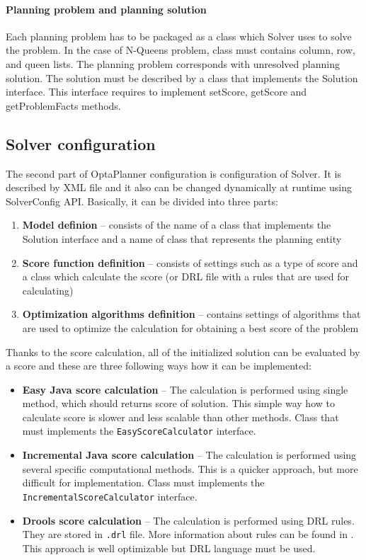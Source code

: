 \paragraph{Planning problem and planning solution}
Each planning problem has to be packaged as a class which Solver uses to solve the problem. In the case of N-Queens problem, class must contains column, row, and queen lists. The planning problem corresponds with unresolved planning solution. The solution must be described by a class that implements the Solution interface. This interface requires to implement setScore, getScore and getProblemFacts methods.

\subsection{Solver configuration}\label{ScoreConfigSection}
The second part of OptaPlanner configuration is configuration of Solver. It is described by XML file and it also can be changed dynamically at runtime using SolverConfig API. Basically, it can be divided into three parts:

\begin{enumerate}
\item \textbf{Model definion} -- consists of the name of a class that implements the Solution interface and a name of class that represents the planning entity
\item \textbf{Score function definition} -- consists of settings such as a type of score and a class which calculate the score (or DRL file with a rules that are used for calculating)
\item \textbf{Optimization algorithms definition} -- contains settings of algorithms that are used to optimize the calculation for obtaining a best score of the problem
\end{enumerate}

Thanks to the score calculation, all of the initialized solution can be evaluated by a score and these are three following ways how it can be implemented:

\begin{itemize}
\item \textbf{Easy Java score calculation} -- The calculation is performed using single method, which should returns score of solution. This simple way how to calculate score is slower and less scalable than other methods. Class that must implements the \texttt{EasyScoreCalculator} interface.
\item \textbf{Incremental Java score calculation} -- The calculation is performed using several specific computational methods. This is a quicker approach, but more difficult for implementation. Class must implements the \texttt{IncrementalScoreCalculator} interface.
\item \textbf{Drools score calculation} -- The calculation is performed using DRL rules. They are stored in \texttt{.drl} file. More information about rules can be found in \cite{DroolsBook, Drools}. This approach is well optimizable but DRL language must be used.
\end{itemize}

